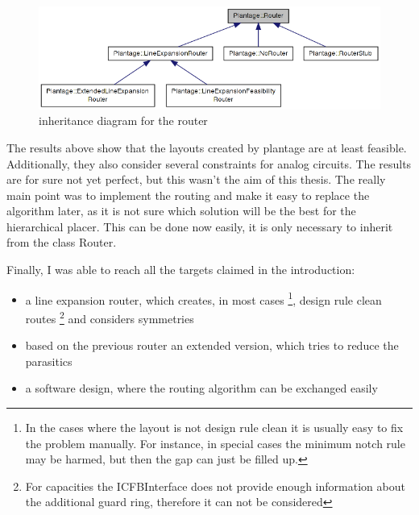\begin{figure}
	\centering
	\includegraphics[scale=.6]{FIG/class_diagram_router.png}
  	\caption{inheritance diagram for the router}
	\label{fig:class_diagram_router}
\end{figure}

The results above show that the layouts created by plantage are at least feasible. Additionally, they also consider several constraints for analog circuits. The results are for sure not yet perfect, but this wasn't the aim of this thesis. The really main point was to implement the routing and make it easy to replace the algorithm later, as it is not sure which solution will be the best for the hierarchical placer. This can be done now easily, it is only necessary to inherit from the class Router.

\begin{samepage}
Finally, I was able to reach all the targets claimed in the introduction:
\begin{itemize}
\item a line expansion router, which creates, in most cases \footnote{In the cases where the layout is not design rule clean it is usually easy to fix the problem manually. For instance, in special cases the minimum notch rule may be harmed, but then the gap can just be filled up.}, design rule clean routes \footnote{For capacities the ICFBInterface does not provide enough information about the additional guard ring, therefore it can not be considered} and considers symmetries
\item based on the previous router an extended version, which tries to reduce the parasitics
\item a software design, where the routing algorithm can be exchanged easily
\end{itemize}
\end{samepage}

